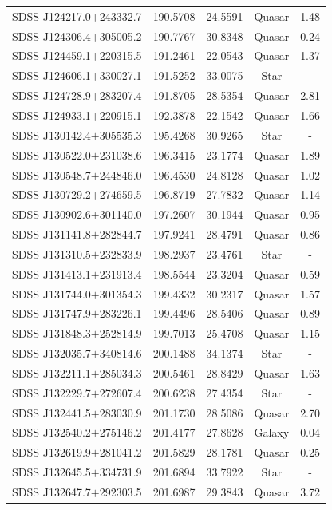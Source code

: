 \begin{longtable}{c c c c c}
SDSS J124217.0$+$243332.7 & 190.5708 & 24.5591 & Quasar & 1.48 \\
SDSS J124306.4$+$305005.2 & 190.7767 & 30.8348 & Quasar & 0.24 \\
SDSS J124459.1$+$220315.5 & 191.2461 & 22.0543 & Quasar & 1.37 \\
SDSS J124606.1$+$330027.1 & 191.5252 & 33.0075 & Star & - \\
SDSS J124728.9$+$283207.4 & 191.8705 & 28.5354 & Quasar & 2.81 \\
SDSS J124933.1$+$220915.1 & 192.3878 & 22.1542 & Quasar & 1.66 \\
SDSS J130142.4$+$305535.3 & 195.4268 & 30.9265 & Star & - \\
SDSS J130522.0$+$231038.6 & 196.3415 & 23.1774 & Quasar & 1.89 \\
SDSS J130548.7$+$244846.0 & 196.4530 & 24.8128 & Quasar & 1.02 \\
SDSS J130729.2$+$274659.5 & 196.8719 & 27.7832 & Quasar & 1.14 \\
SDSS J130902.6$+$301140.0 & 197.2607 & 30.1944 & Quasar & 0.95 \\
SDSS J131141.8$+$282844.7 & 197.9241 & 28.4791 & Quasar & 0.86 \\
SDSS J131310.5$+$232833.9 & 198.2937 & 23.4761 & Star & - \\
SDSS J131413.1$+$231913.4 & 198.5544 & 23.3204 & Quasar & 0.59 \\
SDSS J131744.0$+$301354.3 & 199.4332 & 30.2317 & Quasar & 1.57 \\
SDSS J131747.9$+$283226.1 & 199.4496 & 28.5406 & Quasar & 0.89 \\
SDSS J131848.3$+$252814.9 & 199.7013 & 25.4708 & Quasar & 1.15 \\
SDSS J132035.7$+$340814.6 & 200.1488 & 34.1374 & Star\tnote{b} & - \\
SDSS J132211.1$+$285034.3 & 200.5461 & 28.8429 & Quasar & 1.63 \\
SDSS J132229.7$+$272607.4 & 200.6238 & 27.4354 & Star & - \\
SDSS J132441.5$+$283030.9 & 201.1730 & 28.5086 & Quasar & 2.70 \\
SDSS J132540.2$+$275146.2 & 201.4177 & 27.8628 & Galaxy & 0.04 \\
SDSS J132619.9$+$281041.2 & 201.5829 & 28.1781 & Quasar & 0.25 \\
SDSS J132645.5$+$334731.9 & 201.6894 & 33.7922 & Star & - \\
SDSS J132647.7$+$292303.5 & 201.6987 & 29.3843 & Quasar & 3.72 \\

\end{longtable}
